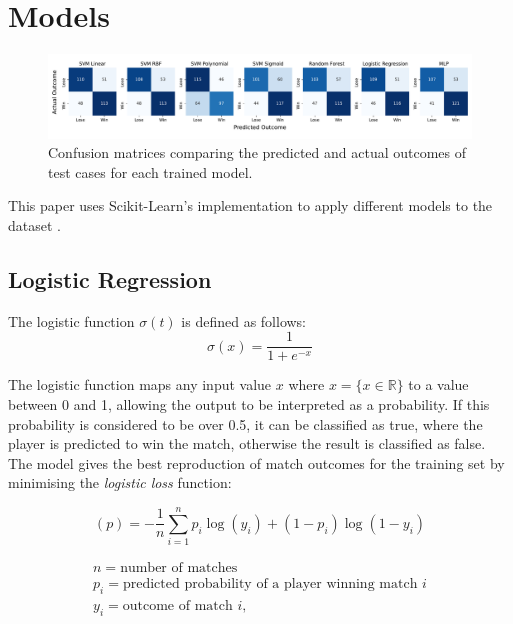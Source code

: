 \section{Models} \label{sec:models}
\begin{figure}[ht]
\centering
\includegraphics[width=18cm]{plots/confusionmatrices.pdf}
\vspace{-1em}
\caption{Confusion matrices comparing the predicted and actual outcomes of test cases for each trained model.}

\label{fig:confusionmatrices}
\centering
\end{figure}

This paper uses Scikit-Learn's implementation to apply different models to the dataset \cite{pedregosa2011scikit}.

\subsection{Logistic Regression}
The logistic function $\sigma(t)$ is defined as follows:
\begin{equation}
    \sigma(x) = \frac{1}{1+e^{-x}}
\end{equation}

The logistic function maps any input value $x$ where $x = \{x\in \mathbb{R} \}$ to a value between 0 and 1, allowing the output to be interpreted as a probability. If this probability is considered to be over 0.5, it can be classified as true, where the player is predicted to win the match, otherwise the result is classified as false. The model gives the best reproduction of match outcomes for the training set by minimising the \textit{logistic loss} function:

\begin{equation}
    (p) = -\frac{1}{n} \sum_{i=1}^n p_i \log(y_i) + (1-p_i)\log(1-y_i)
\end{equation}

$$
\begin{gathered}
    n = \text{number of matches} \\
    p_i = \text{predicted probability of a player winning match $i$} \\
    y_i = \text{outcome of match $i$},
\end{gathered}
$$

